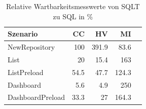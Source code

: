 \begin{table}[ht]
\centering
\caption{Relative Wartbarkeitsmesswerte von SQLT zu SQL in \%}
\begin{tabular}{lrrrr}
\toprule
Szenario & CC & HV & MI \\
\midrule
	NewRepository &  100 & \cellcolor{red!30}  391.9 & \cellcolor{red!17}  83.6 \\
	List & \cellcolor{green!30}  20 & \cellcolor{green!30}  15.4 & \cellcolor{green!30}  163 \\
	ListPreload & \cellcolor{green!28}  54.5 & \cellcolor{green!30}  47.7 & \cellcolor{green!20}  124.3 \\
	Dashboard & \cellcolor{green!30}  5.6 & \cellcolor{green!30}  4.9 & \cellcolor{green!30}  250 \\
	DashboardPreload & \cellcolor{green!30}  33.3 & \cellcolor{green!30}  27 & \cellcolor{green!30}  164.3 \\
\bottomrule
\end{tabular}
\label{tab:wartbarkeit_relativ_sqlt}
\end{table}
	